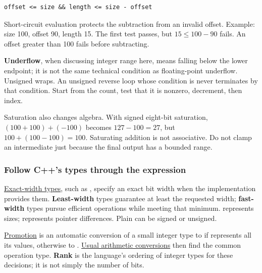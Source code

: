 \begin{verbatim}
offset <= size && length <= size - offset
\end{verbatim}

Short-circuit evaluation protects the subtraction from an invalid offset. Example: size 100, offset 90, length 15. The first test passes, but \(15\le 100-90\) fails. An offset greater than 100 fails before subtracting.

\textbf{Underflow}, when discussing integer range here, means falling below the lower endpoint; it is not the same technical condition as floating-point underflow. Unsigned  wraps. An unsigned reverse loop whose condition is  never terminates by that condition. Start from the count, test that it is nonzero, decrement, then index.

Saturation also changes algebra. With signed eight-bit saturation, \((100+100)+(-100)\) becomes \(127-100=27\), but \(100+(100-100)=100\). Saturating addition is not associative. Do not clamp an intermediate just because the final output has a bounded range.

\subsubsection{Follow C++'s types through the expression}\label{01-foundations-i-ch001-follow-cs-types-through-the-expression}

\hypertarget{01-foundations-i-ch001-follow-cs-types-through-the-expression}{}

\hyperref[appendix-cc04044b5782]{Exact-width types}, such as , specify an exact bit width when the implementation provides them. \textbf{Least-width} types guarantee at least the requested width; \textbf{fast-width} types pursue efficient operations while meeting that minimum.  represents sizes;  represents pointer differences. Plain  can be signed or unsigned.

\hyperref[appendix-45303d03796a]{Promotion} is an automatic conversion of a small integer type to  if  represents all its values, otherwise to . \hyperref[appendix-5e2d663adf7f]{Usual arithmetic conversions} then find the common operation type. \textbf{Rank} is the language's ordering of integer types for these decisions; it is not simply the number of bits.

